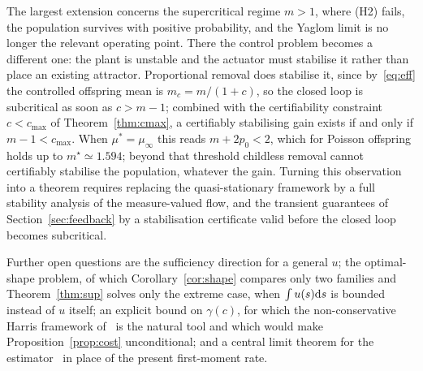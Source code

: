 \documentclass[letterpaper, 10pt, conference]{ieeeconf}
\newcommand{\pl}[1]{#1}
\begin{document}
{\pl{The largest extension} concerns the supercritical regime $m>1$, where
(H2) fails, the population survives with positive probability, and the Yaglom
limit is no longer the relevant operating point. \pl{There the control problem
becomes a different one}: the plant is unstable and the actuator must
\pl{stabilise} it rather than place an existing attractor. \pl{Proportional
removal does stabilise it}, since by~\eqref{eq:eff} the controlled offspring mean is $m_c=m/(1+c)$, so the
closed loop is subcritical as soon as $c>m-1$; combined with the certifiability
constraint $c<c_{\max}$ of Theorem~\ref{thm:cmax}, a certifiably stabilising
gain exists if and only if $m-1<c_{\max}$. When $\mu^\ast=\mu_\infty$ this reads
$m+2p_0<2$, which for Poisson offspring holds up to $m^\star\simeq1.594$; beyond
that threshold childless removal cannot certifiably stabilise the population,
whatever the gain. Turning this observation into a theorem requires replacing
the quasi-stationary framework by a \pl{full} stability analysis of the
measure-valued flow, and the transient guarantees of
Section~\ref{sec:feedback} by a stabilisation certificate valid before the
closed loop becomes subcritical.

\pl{Further open questions are} the sufficiency direction for a general $u$; the
optimal-shape problem, of which Corollary~\ref{cor:shape} compares only two
families and Theorem~\ref{thm:sup} solves only the extreme case, \pl{when
$\int u(s){\rm d}s$ is bounded instead of $u$ itself}; an explicit bound on
$\gamma(c)$, for which the non-conservative Harris framework
of~\cite{bansaye2022} \pl{is the natural tool} and which would make
Proposition~\ref{prop:cost} unconditional; and a central limit theorem for the
estimator~\cite{cerou} in place of the present first-moment rate.}



\end{document}

